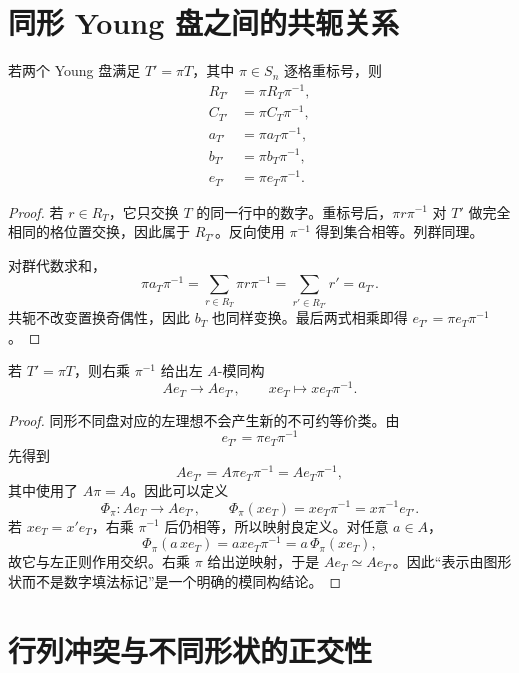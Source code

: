 \section{同形 Young 盘之间的共轭关系}

\begin{lemma}[行群与列群随重标号共轭]
若两个 Young 盘满足 $T'=\pi T$，其中 $\pi\in S_n$ 逐格重标号，则
\begin{align}
R_{T'}&=\pi R_T\pi^{-1},\\
C_{T'}&=\pi C_T\pi^{-1},\\
a_{T'}&=\pi a_T\pi^{-1},\\
b_{T'}&=\pi b_T\pi^{-1},\\
e_{T'}&=\pi e_T\pi^{-1}.
\label{eq:young-conjugation-all}
\end{align}

\end{lemma}

\begin{proof}
若 $r\in R_T$，它只交换 $T$ 的同一行中的数字。重标号后，$\pi r\pi^{-1}$ 对 $T'$ 做完全相同的格位置交换，因此属于 $R_{T'}$。反向使用 $\pi^{-1}$ 得到集合相等。列群同理。

对群代数求和，
\[
\pi a_T\pi^{-1}
=\sum_{r\in R_T}\pi r\pi^{-1}
=\sum_{r'\in R_{T'}}r'=a_{T'}.
\]
共轭不改变置换奇偶性，因此 $b_T$ 也同样变换。最后两式相乘即得 $e_{T'}=\pi e_T\pi^{-1}$。
\end{proof}

\begin{proposition}[同形盘给出的左理想同构]
若 $T'=\pi T$，则右乘 $\pi^{-1}$ 给出左 $A$-模同构
\[
Ae_T\longrightarrow Ae_{T'},\qquad xe_T\longmapsto xe_T\pi^{-1}.
\]
\end{proposition}

\begin{proof}
同形不同盘对应的左理想不会产生新的不可约等价类。由
\[
e_{T'}=\pi e_T\pi^{-1}
\]
先得到
\[
Ae_{T'}=A\pi e_T\pi^{-1}=Ae_T\pi^{-1},
\]
其中使用了 $A\pi=A$。因此可以定义
\[
\Phi_\pi:Ae_T\to Ae_{T'},
\qquad
\Phi_\pi(xe_T)=xe_T\pi^{-1}=x\pi^{-1}e_{T'}.
\]
若 $xe_T=x'e_T$，右乘 $\pi^{-1}$ 后仍相等，所以映射良定义。对任意 $a\in A$，
\[
\Phi_\pi(a\,xe_T)=axe_T\pi^{-1}=a\,\Phi_\pi(xe_T),
\]
故它与左正则作用交织。右乘 $\pi$ 给出逆映射，于是 $Ae_T\simeq Ae_{T'}$。因此“表示由图形状而不是数字填法标记”是一个明确的模同构结论。
\end{proof}

\section{行列冲突与不同形状的正交性}

